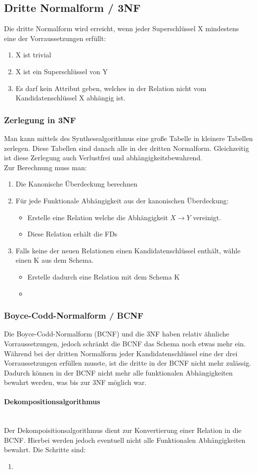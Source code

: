 \documentclass{article}
\newcommand{\paragraphlb}[1]{\paragraph{#1}\mbox{}\\}
\begin{document}
	\subsection{Dritte Normalform / 3NF}
	Die dritte Normalform wird erreicht, wenn jeder Superschlüssel X mindestens eine der Vorraussetzungen erfüllt: 
	\begin{enumerate}
		\item{X ist trivial}
		\item{X ist ein Superschlüssel von Y}
		\item{Es darf kein Attribut geben, welches in der Relation nicht vom Kandidatenschlüssel X abhängig ist.}
	\end{enumerate}

	\subsubsection{Zerlegung in 3NF}
	Man kann mittels des Synthesealgorithmus eine große Tabelle in kleinere Tabellen zerlegen. Diese Tabellen sind danach alle in der dritten Normalform. Gleichzeitig ist diese Zerlegung auch Verlustfrei und abhängigkeitsbewahrend. \\
	Zur Berechnung muss man:
	\begin{enumerate}
		\item{Die Kanonische Überdeckung berechnen}
		\item{Für jede Funktionale Abhängigkeit aus der kanonischen Überdeckung:}
		\begin{itemize}
			\item{Erstelle eine Relation welche die Abhängigkeit $X \to Y$ vereinigt.}
			\item{Diese Relation erhält die FDs}
		\end{itemize}
		\item{Falls keine der neuen Relationen einen Kandidatenschlüssel enthält, wähle einen K aus dem Schema.}
		\begin{itemize}
			\item{Erstelle dadurch eine Relation mit dem Schema K}
			\item{}
		\end{itemize}
	\end{enumerate}
	\subsubsection{Boyce-Codd-Normalform / BCNF}
	Die Boyce-Codd-Normalform (BCNF) und die 3NF haben relativ ähnliche Vorraussetzungen, jedoch schränkt die BCNF das Schema noch etwas mehr ein. Während bei der dritten Normalform jeder Kandidatenschlüssel eine der drei Vorraussetzungen erfüllen musste, ist die dritte in der BCNF nicht mehr zulässig. Dadurch können in der BCNF nicht mehr alle funktionalen Abhängigkeiten bewahrt werden, was bis zur 3NF möglich war.
	\paragraphlb{Dekompositionsalgorithmus}
	Der Dekompoisitionsalgorithmus dient zur Konvertierung einer Relation in die BCNF. Hierbei werden jedoch eventuell nicht alle Funktionalen Abhängigkeiten bewahrt. Die Schritte sind:
	\begin{enumerate}
		\item{}
	\end{enumerate}
\end{document}

